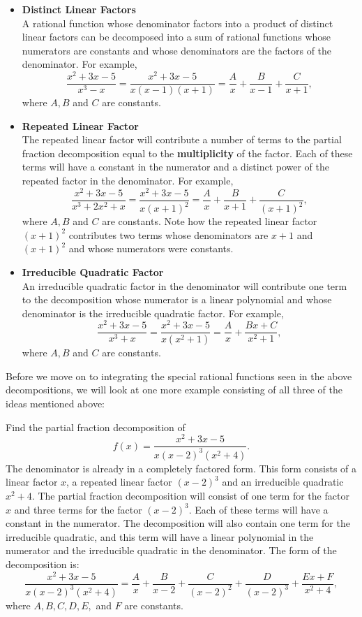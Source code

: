 \documentclass{ximera}
\begin{document}
\begin{itemize}

\item{\textbf{Distinct Linear Factors}} \\
A rational function whose denominator factors into a product of distinct linear factors
can be decomposed into a sum of rational functions whose numerators are constants and whose denominators are the factors of the denominator.
For example, 
\[
\frac{x^2 + 3x -5}{x^3 -x} = \frac{x^2 + 3x -5}{x(x-1)(x+1)} = \frac{A}{x} + \frac{B}{x-1} + \frac{C}{x+1},
\]
where $A, B$ and $C$ are constants.




\item{\textbf{Repeated Linear Factor}} \\
The repeated linear factor will contribute a number of terms to the partial fraction 
decomposition equal to the \textbf{multiplicity} of the factor. Each of these terms will have a constant in the numerator and a 
distinct power of the repeated factor in the denominator.
For example, 
\[
\frac{x^2 + 3x -5}{x^3 + 2x^2 + x} = \frac{x^2 + 3x -5}{x(x+1)^2} = \frac{A}{x} + \frac{B}{x+1} + \frac{C}{(x+1)^2},
\]
where $A, B$ and $C$ are constants. Note how the repeated linear factor $(x+1)^2$ contributes two terms whose denominators are $x+1$ and $(x+1)^2$
and whose numerators were constants.


\item{\textbf{Irreducible Quadratic Factor}} \\
An irreducible quadratic factor in the denominator will contribute one term to the decomposition whose numerator
is a linear polynomial and whose denominator is the irreducible quadratic factor.
For example, 
\[
\frac{x^2 + 3x -5}{x^3 +x} = \frac{x^2 + 3x -5}{x(x^2+1)} = \frac{A}{x} + \frac{Bx + C}{x^2 + 1},
\]
where $A, B$ and $C$ are constants.


\end{itemize}

Before we move on to integrating the special rational functions seen in the above decompositions, 
we will look at one more example consisting of all three of the ideas mentioned above:
 
\begin{example}[example 1]
Find the partial fraction decomposition of
\[
  f(x) = \frac{x^2 + 3x -5}{x(x-2)^3(x^2 + 4)}. 
\]
The denominator is already in a completely factored form.  This form consists of a linear factor $x$, 
a repeated linear factor $(x-2)^3$ and an irreducible quadratic $x^2 + 4$. 
The partial fraction decomposition will consist of one term for the factor $x$ and three terms for the factor
$(x-2)^3$.  Each of these terms will have a constant in the numerator.  
The decomposition will also contain one term for the irreducible quadratic, and this term 
will have a linear polynomial in the numerator and the irreducible quadratic in the denominator.
The form of the decomposition is:
\[
  \frac{x^2 + 3x -5}{x(x-2)^3(x^2 + 4)} = \frac{A}{x} + \frac{B}{x-2} + \frac{C}{(x-2)^2} + \frac{D}{(x-2)^3} +\frac{Ex+F}{x^2+4},
\]
where $A, B, C, D, E,$ and $F$ are constants.

\end{example}
\end{document}
